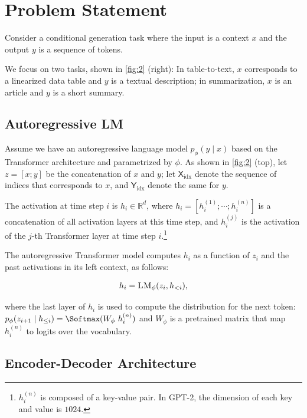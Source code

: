 \section{Problem Statement} 

\label{sec:problem_statement}
Consider a conditional generation task where the input is a context $x$ and the output $y$ is a sequence of tokens. 

We focus on two tasks, shown in \ref{fig:2} (right): In table-to-text, $x$ corresponds to a linearized data table and $y$ is a textual description; in summarization, $x$ is an article and $y$ is a short summary.

\subsection{Autoregressive LM} Assume we have an autoregressive language model $p_\phi(y \mid x)$ based on the Transformer \cite{Vaswani2017Attn} architecture \citep[e.g., GPT-2;][]{Radford2019gpt2} and parametrized by $\phi$. As shown in \ref{fig:2} (top), let $z = [x;y]$ be the concatenation of $x$ and $y$; let $\textsf{X$_{\text{idx}}$}$ denote the sequence of indices that corresponds to $x$, and $\textsf{Y$_{\text{idx}}$}$ denote the same for $y$. 

The activation at time step $i$ is $h_i \in \mathbb R^d$, where $h_i = [h_i^{(1)}; \cdots ; h_i^{(n)}]$ is a concatenation of all activation layers at this time step, and $h_i^{(j)}$ is the activation of the $j$-th Transformer layer at time step $i$.\footnote{$h_i^{(n)}$ is composed of a key-value pair. In GPT-2, the dimension of each key and value is $1024$.} 

The autoregressive Transformer model computes $h_i$ as a function of $z_i$ and the past activations in its left context, as follows:

\begin{align}
h_i = \textsc{LM}_\phi(z_i, h_{<i}) \text{,}
\label{eqn:recur}
\end{align}

where the last layer of $h_i$ is used to compute the distribution for the next token: $p_{\phi}(z_{i+1} \mid h_{\leq i}) = \Softmax(W_\phi ~h_{i}^{(n)})$ and $W_\phi$ is a pretrained matrix that map $h_{i}^{(n)}$ to logits over the vocabulary. 

\subsection{Encoder-Decoder Architecture}

